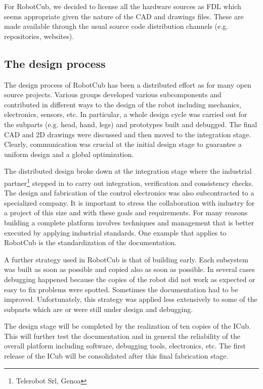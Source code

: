 For RobotCub, we decided to license all the hardware sources as FDL which seems
appropriate given the nature of the CAD and drawings files. These are made 
available through the usual source code distribution channels (e.g. repositories, 
websites).

\subsection{The design process}
The design process of RobotCub has been a distributed effort as for many open
source projects. Various groups developed various subcomponents and contributed in
different ways to the design of the robot including mechanics, electronics, sensors, 
etc. In particular, a whole design cycle was carried out for the subparts (e.g.
head, hand, legs) and prototypes built and debugged. The final CAD and 2D drawings 
were discussed and then moved to the integration stage. Clearly, communication
was crucial at the initial design stage to guarantee a uniform design and a
global optimization.

The distributed design broke down at the integration stage where the industrial 
partner\footnote{Telerobot Srl, Genoa} stepped in to carry out integration, 
verification and consistency checks. The design and fabrication of the control 
electronics was also subcontracted to a specialized company.
It is important to stress the collaboration with industry for a project of this
size and with these goals and requirements. For many reasons building a complete 
platform involves techniques and management that is better executed by applying 
industrial standards. One example that applies to RobotCub is the standardization 
of the documentation.

A further strategy used in RobotCub is that of building early. Each subsystem
was built as soon as possible and copied also as soon as possible. In several cases
debugging happened because the copies of the robot did not work as expected or
easy to fix problems were spotted. Sometimes the documentation had to be improved.
Unfortunately, this strategy was applied less extensively to some of the subparts 
which are or were still under design and debugging. 

The design stage will be completed by the realization of ten copies of the ICub.
This will further test the documentation and in general the reliability of the
overall platform including software, debugging tools, electronics, etc. The first
release of the ICub will be consolidated after this final fabrication stage.

